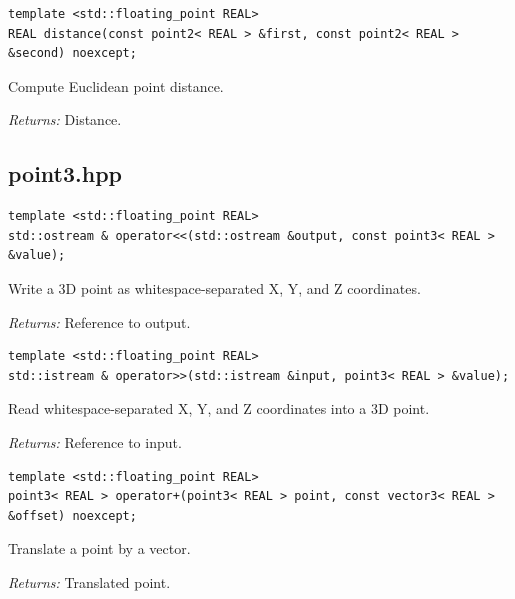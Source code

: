 \par\noindent\begin{minipage}{\linewidth}
\begin{lstlisting}[style=apireference]
template <std::floating_point REAL>
REAL distance(const point2< REAL > &first, const point2< REAL > &second) noexcept;
\end{lstlisting}
{\footnotesize Compute Euclidean point distance.\par}
{\footnotesize\textit{Returns:} Distance.\par}
\end{minipage}\par\vspace{1pt}
\subsection{point3.hpp}
\par\noindent\begin{minipage}{\linewidth}
\begin{lstlisting}[style=apireference]
template <std::floating_point REAL>
std::ostream & operator<<(std::ostream &output, const point3< REAL > &value);
\end{lstlisting}
{\footnotesize Write a 3D point as whitespace-separated X, Y, and Z coordinates.\par}
{\footnotesize\textit{Returns:} Reference to output.\par}
\end{minipage}\par\vspace{1pt}
\par\noindent\begin{minipage}{\linewidth}
\begin{lstlisting}[style=apireference]
template <std::floating_point REAL>
std::istream & operator>>(std::istream &input, point3< REAL > &value);
\end{lstlisting}
{\footnotesize Read whitespace-separated X, Y, and Z coordinates into a 3D point.\par}
{\footnotesize\textit{Returns:} Reference to input.\par}
\end{minipage}\par\vspace{1pt}
\par\noindent\begin{minipage}{\linewidth}
\begin{lstlisting}[style=apireference]
template <std::floating_point REAL>
point3< REAL > operator+(point3< REAL > point, const vector3< REAL > &offset) noexcept;
\end{lstlisting}
{\footnotesize Translate a point by a vector.\par}
{\footnotesize\textit{Returns:} Translated point.\par}
\end{minipage}\par\vspace{1pt}
